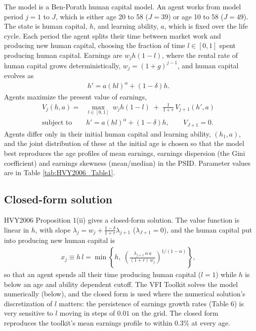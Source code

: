 \documentclass[11pt,fleqn]{article}
\begin{document}
The model is a Ben-Porath human capital model. An agent works from model period $j=1$ to $J$, which is either age 20 to 58 ($J=39$) or age 10 to 58 ($J=49$). The state is human capital, $h$, and learning ability, $a$, which is fixed over the life cycle. Each period the agent splits their time between market work and producing new human capital, choosing the fraction of time $l\in[0,1]$ spent producing human capital. Earnings are $w_j h (1-l)$, where the rental rate of human capital grows deterministically, $w_j=(1+g)^{j-1}$, and human capital evolves as
\begin{align*}
 h' = a (h l)^\alpha + (1-\delta) h.
\end{align*}
Agents maximize the present value of earnings,
\begin{align*}
 V_j(h,a) = & \max_{l\in[0,1]} \; w_j h (1-l) \; + \; \frac{1}{1+r}\, V_{j+1}(h',a) \\
 \text{subject to } & h' = a (h l)^\alpha + (1-\delta) h, \qquad V_{J+1}=0.
\end{align*}
Agents differ only in their initial human capital and learning ability, $(h_1,a)$, and the joint distribution of these at the initial age is chosen so that the model best reproduces the age profiles of mean earnings, earnings dispersion (the Gini coefficient) and earnings skewness (mean/median) in the PSID. Parameter values are in Table \ref{tab:HVY2006_Table1}.

\subsection{Closed-form solution}

HVY2006 Proposition 1(ii) gives a closed-form solution. The value function is linear in $h$, with slope $\lambda_j=w_j+\frac{1-\delta}{1+r}\lambda_{j+1}$ ($\lambda_{J+1}=0$), and the human capital put into producing new human capital is
\begin{align*}
 x_j \equiv h\,l = \min\!\left\{ h,\; \left(\frac{\lambda_{j+1}\,\alpha\, a}{(1+r)\,w_j}\right)^{1/(1-\alpha)} \right\},
\end{align*}
so that an agent spends all their time producing human capital ($l=1$) while $h$ is below an age and ability dependent cutoff. The VFI Toolkit solves the model numerically (below), and the closed form is used where the numerical solution's discretization of $l$ matters: the persistence of earnings growth rates (Table 6) is very sensitive to $l$ moving in steps of $0.01$ on the grid. The closed form reproduces the toolkit's mean earnings profile to within 0.3\% at every age.
\end{document}
